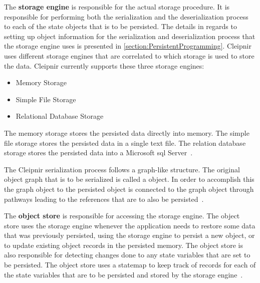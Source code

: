 The \textbf{storage engine} is responsible for the actual storage procedure. It is responsible for performing both the serialization and the deserialization process to each of the state objects that is to be persisted. The details in regards to setting up object information for the serialization and deserialization process that the storage engine uses is presented in \autoref{section:PersistentProgramming}. Cleipnir uses different storage engines that are correlated to which storage is used to store the data. Cleipnir currently supports these three storage engines:
\begin{itemize}
	\item{Memory Storage}
	\item{Simple File Storage}
	\item{Relational Database Storage}
\end{itemize}
\cites[p.~10,12]{PAPER:PaxosCleipnir}

The memory storage stores the persisted data directly into memory.
The simple file storage stores the persisted data in a single text file.
The relation database storage stores the persisted data into a Microsoft \acs{sql} Server~\cite{WEB:MSSQL}.

The Cleipnir serialization process follows a graph-like structure. The original object graph that is to be serialized is called a  object. In order to accomplish this the  graph object to the persisted object is connected to the graph object through pathways leading to the references that are to also be persisted~\cite[p.~10]{PAPER:PaxosCleipnir}.


The \textbf{object store} is responsible for accessing the storage engine. The object store uses the storage engine whenever the application needs to restore some data that was previously persisted, using the storage engine to persist a new object, or to update existing object records in the persisted memory. The object store is also responsible for detecting changes done to any state variables that are set to be persisted.
The object store uses a statemap to keep track of records for each of the state variables that are to be persisted and stored by the storage engine~\cite[p.~11]{PAPER:PaxosCleipnir}.

